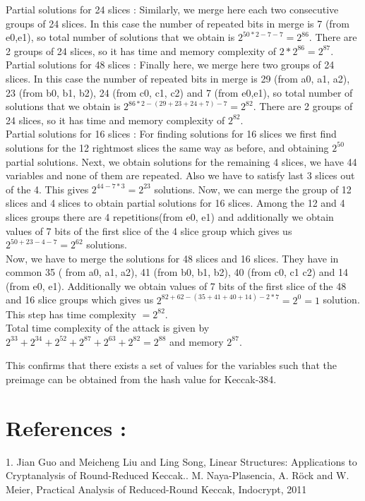 \documentclass{article}
\begin{document}
\newpar
Partial solutions for 24 slices : Similarly, we merge here each two consecutive groups of 24 slices. In this case the number of repeated bits in merge is 7 (from e0,e1), so total number of solutions that we obtain is $2^{50*2 - 7 - 7 } = 2^{86}$. There are 2 groups of 24 slices, so it has time and memory complexity of $2*2^{86} = 2^{87}$.\\

\newpar
Partial solutions for 48 slices : Finally here, we merge here two groups of 24 slices. In this case the number of repeated bits in merge is 29 (from a0, a1, a2), 23 (from b0, b1, b2), 24 (from c0, c1, c2) and 7 (from e0,e1), so total number of solutions that we obtain is $2^{86*2 - (29 + 23 + 24 + 7) - 7 } = 2^{82}$. There are 2 groups of 24 slices, so it has time and memory complexity of $2^{82}$.\\

\newpar
Partial solutions for 16 slices : For finding solutions for 16 slices we first find solutions for the 12 rightmost slices the same way as before, and obtaining $2^{50}$ partial solutions. 
Next, we obtain solutions for the remaining 4 slices, we have 44 variables and none of them are repeated. Also we have to satisfy last 3 slices out of the 4. This gives $2^{44 - 7*3} = 2^{23}$ solutions.
Now, we can merge the group of 12 slices and 4 slices to obtain partial solutions for 16 slices. Among the 12 and 4 slices groups there are 4 repetitions(from e0, e1) and additionally we obtain values of 7 bits of the first slice of the 4 slice group which gives us $2^{50 + 23 - 4 -7} = 2^{62}$ solutions.\\

Now, we have to merge the solutions for 48 slices and 16 slices. They have in common 35 ( from a0, a1, a2), 41 (from b0, b1, b2), 40 (from c0, c1 c2) and 14 (from e0, e1). Additionally we obtain values of 7 bits of the first slice of the 48 and 16 slice groups which gives us $2^{82 + 62 - (35+ 41 + 40 + 14) - 2*7} = 2^{0} = 1$ solution. This step has time complexity $ = 2^{82}$.\\

Total time complexity of the attack is given by $2^{33} + 2^{34} + 2^{52} + 2^{87} + 2^{63} + 2^{82} = 2^{88}$ and memory $2^{87}$. 

This confirms that there exists a set of values for the variables such that the preimage can be obtained from the hash value for Keccak-384.

\section{References :}

1. Jian Guo and Meicheng Liu and Ling Song, Linear Structures: Applications to Cryptanalysis of Round-Reduced Keccak.. M. Naya-Plasencia, A. Röck and W. Meier, Practical Analysis of Reduced-Round Keccak, Indocrypt, 2011
\end{document}
